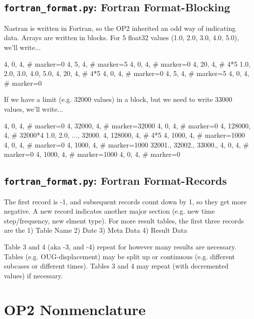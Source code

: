  \subsection{{\tt fortran_format.py}: Fortran Format-Blocking}
     Nastran is written in Fortran, so the OP2 inherited an odd way of indicating data.  Arrays are written in blocks.  For 5 float32 values (1.0, 2.0, 3.0, 4.0, 5.0), we'll write...
     
         4, 0, 4,  # marker=0
         4, 5, 4,  # marker=5
         4, 0, 4,  # marker=0
         4, 20, 4, # 4*5
         1.0, 2.0, 3.0, 4.0, 5.0,
         4, 20, 4, # 4*5
         4, 0, 4,  # marker=0
         4, 5, 4,  # marker=5
         4, 0, 4,  # marker=0
     
     If we have a limit (e.g. 32000 values) in a block, but we need to write 33000 values, we'll write...
     
         4, 0, 4,      # marker=0
         4, 32000, 4,  # marker=32000
         4, 0, 4,      # marker=0
         4, 128000, 4, # 32000*4
         1.0, 2.0, ..., 32000.
         4, 128000, 4, # 4*5
         4, 1000, 4,   # marker=1000
         4, 0, 4,      # marker=0
         4, 1000, 4,   # marker=1000
         32001., 32002., 33000.,
         4, 0, 4,    # marker=0
         4, 1000, 4, # marker=1000
         4, 0, 4,    # marker=0
         
 \subsection{{\tt fortran_format.py}: Fortran Format-Records}
     The first record is -1, and subsequent records count down by 1, so they get more negative.  A new record indicates another major section (e.g. new time step/frequency, new elment type).  For more result tables, the first three records are the
       1) Table Name
       2) Date
       3) Meta Data
       4) Result Data
     
     Table 3 and 4 (aka -3, and -4) repeat for however many results are necessary.  Tables (e.g. OUG-displacement) may be split up or continuous (e.g. different subcases or different times).  Tables 3 and 4 may repeat (with decremented values) if necessary.
     
\section{OP2 Nonmenclature}

